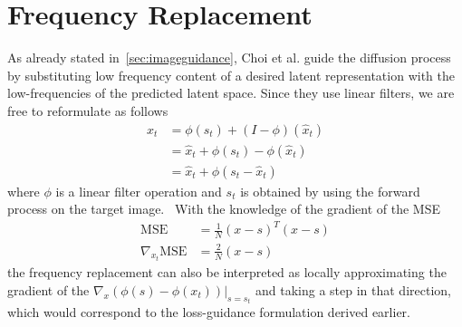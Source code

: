 \section{Frequency Replacement}
\label{sec:freqreplacement}
As already stated in~\ref{sec:imageguidance}, Choi et al. guide the diffusion process by substituting low frequency content of a desired latent representation with the low-frequencies of the predicted latent space. Since they use linear filters, we are free to reformulate as follows
\begin{align}
    \label{eq:ilvr}
    x_{t} & = \phi(s_{t}) + (I - \phi) (\hat{x}_{t})        \\
          & = \hat{x}_{t} + \phi(s_{t}) - \phi(\hat{x}_{t}) \\
          & = \hat{x}_{t} + \phi(s_{t} - \hat{x}_{t})
\end{align}
where $\phi$ is a linear filter operation and $s_t$ is obtained by using the forward process on the target image.~\autocite{choi2021ilvr} With the knowledge of the gradient of the MSE
\begin{align}
    \text{MSE}              & = \frac{1}{N} (x - s)^T (x - s) \\
    \nabla_{x_t} \text{MSE} & = \frac{2}{N} (x - s)
\end{align}
the frequency replacement can also be interpreted as locally approximating the gradient of the $\nabla_{x}(\phi(s) - \phi(x_{t}))|_{s=s_t}$ and taking a step in that direction, which would correspond to the loss-guidance formulation derived earlier.

